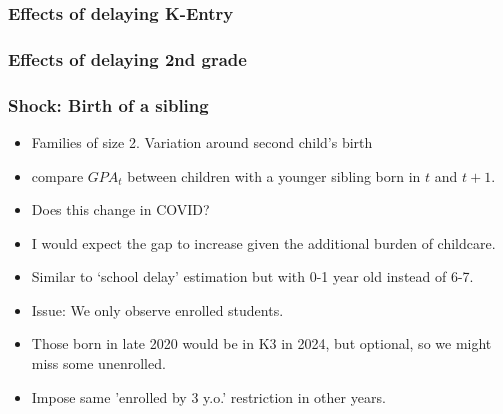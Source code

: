\documentclass{beamer}
\begin{document}
\begin{frame}
    \frametitle{Effects of delaying K-Entry}
    
\end{frame}


\begin{frame}
    \frametitle{Effects of delaying 2nd grade}
    
\end{frame}






\begin{frame}
    \label{update_scott}
    \frametitle{Shock: Birth of a sibling}
      \begin{itemize}
          \item Families of size 2. Variation around second child's birth
          \item compare $GPA_t$ between children with a younger sibling born in $t$ and $t+1$. 
          \item Does this change in COVID?
          \item I would expect the gap to increase given the additional burden of childcare.
          \item Similar to `school delay' estimation but with 0-1 year old instead of 6-7.
          \item Issue: We only observe enrolled students.
          \item Those born in late 2020 would be in K3 in 2024, but optional, so we might miss some unenrolled.
          \item Impose same 'enrolled by 3 y.o.' restriction in other years.
      \end{itemize}
\end{frame}
\end{document}
